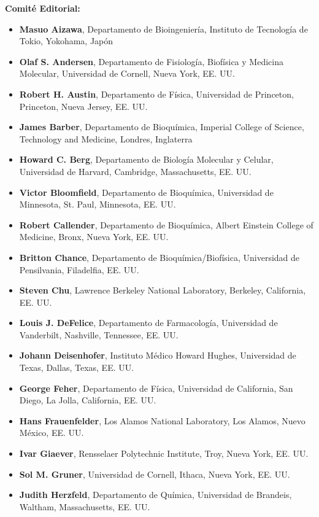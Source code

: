 ﻿\documentclass{book}
\begin{document}
\vspace{1.5em}
\noindent\textbf{Comité Editorial:}
\begin{small}
\begin{itemize}
    \item \textbf{Masuo Aizawa}, Departamento de Bioingeniería, Instituto de Tecnología de Tokio, Yokohama, Japón
    \item \textbf{Olaf S. Andersen}, Departamento de Fisiología, Biofísica y Medicina Molecular, Universidad de Cornell, Nueva York, EE. UU.
    \item \textbf{Robert H. Austin}, Departamento de Física, Universidad de Princeton, Princeton, Nueva Jersey, EE. UU.
    \item \textbf{James Barber}, Departamento de Bioquímica, Imperial College of Science, Technology and Medicine, Londres, Inglaterra
    \item \textbf{Howard C. Berg}, Departamento de Biología Molecular y Celular, Universidad de Harvard, Cambridge, Massachusetts, EE. UU.
    \item \textbf{Victor Bloomfield}, Departamento de Bioquímica, Universidad de Minnesota, St. Paul, Minnesota, EE. UU.
    \item \textbf{Robert Callender}, Departamento de Bioquímica, Albert Einstein College of Medicine, Bronx, Nueva York, EE. UU.
    \item \textbf{Britton Chance}, Departamento de Bioquímica/Biofísica, Universidad de Pensilvania, Filadelfia, EE. UU.
    \item \textbf{Steven Chu}, Lawrence Berkeley National Laboratory, Berkeley, California, EE. UU.
    \item \textbf{Louis J. DeFelice}, Departamento de Farmacología, Universidad de Vanderbilt, Nashville, Tennessee, EE. UU.
    \item \textbf{Johann Deisenhofer}, Instituto Médico Howard Hughes, Universidad de Texas, Dallas, Texas, EE. UU.
    \item \textbf{George Feher}, Departamento de Física, Universidad de California, San Diego, La Jolla, California, EE. UU.
    \item \textbf{Hans Frauenfelder}, Los Alamos National Laboratory, Los Alamos, Nuevo México, EE. UU.
    \item \textbf{Ivar Giaever}, Rensselaer Polytechnic Institute, Troy, Nueva York, EE. UU.
    \item \textbf{Sol M. Gruner}, Universidad de Cornell, Ithaca, Nueva York, EE. UU.
    \item \textbf{Judith Herzfeld}, Departamento de Química, Universidad de Brandeis, Waltham, Massachusetts, EE. UU.

\end{itemize}
\end{small}
\end{document}
